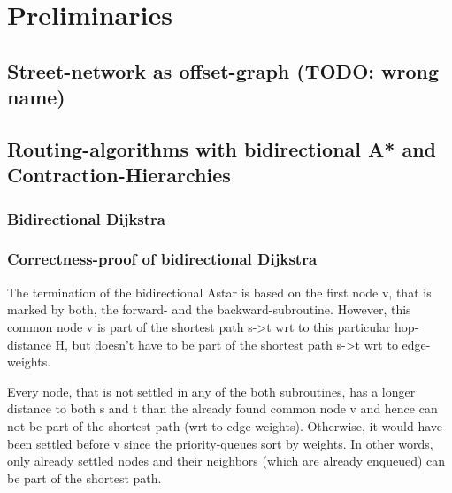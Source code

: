 \chapter{Preliminaries}
\label{chap:preliminaries}




    \section{Street-network as offset-graph (TODO: wrong name)}


    \section{Routing-algorithms with bidirectional A* and Contraction-Hierarchies}


        \subsection{Bidirectional Dijkstra}


        \subsection{Correctness-proof of bidirectional Dijkstra}

        The termination of the bidirectional Astar is based on the first node v, that is marked by both, the forward- and the backward-subroutine.
        However, this common node v is part of the shortest path s->t wrt to this particular hop-distance H, but doesn't have to be part of the shortest path s->t wrt to edge-weights.

        Every node, that is not settled in any of the both subroutines, has a longer distance to both s and t than the already found common node v and hence can not be part of the shortest path (wrt to edge-weights).
        Otherwise, it would have been settled before v since the priority-queues sort by weights.
        In other words, only already settled nodes and their neighbors (which are already enqueued) can be part of the shortest path.

